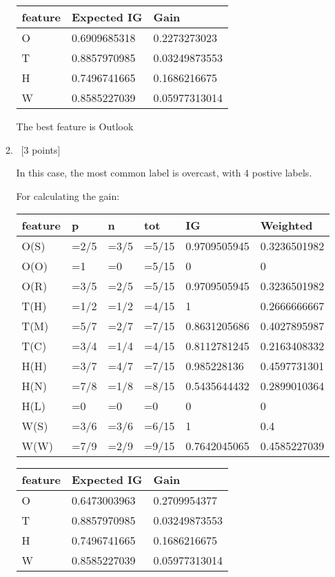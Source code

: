 \documentclass[12pt, fullpage,letterpaper]{article}
\begin{document}
\begin{enumerate}
\begin{enumerate}
	\begin{tabular}{|l|l|l|}
		\hline
		feature & Expected IG  & Gain          \\ \hline
		O       & 0.6909685318 & 0.2273273023  \\ \hline
		T       & 0.8857970985 & 0.03249873553 \\ \hline
		H       & 0.7496741665 & 0.1686216675  \\ \hline
		W       & 0.8585227039 & 0.05977313014 \\ \hline
		\end{tabular}

	The best feature is Outlook

\item~[3 points] 

In this case, the most common label is overcast, with 4 postive labels. 

For calculating the gain:

\begin{tabular}{|l|l|l|l|l|l|}
	\hline
	feature & p    & n    & tot   & IG           & Weighted     \\ \hline
	O(S)    & =2/5 & =3/5 & =5/15 & 0.9709505945 & 0.3236501982 \\ \hline
	O(O)    & =1   & =0   & =5/15 & 0            & 0            \\ \hline
	O(R)    & =3/5 & =2/5 & =5/15 & 0.9709505945 & 0.3236501982 \\ \hline
	T(H)    & =1/2 & =1/2 & =4/15 & 1            & 0.2666666667 \\ \hline
	T(M)    & =5/7 & =2/7 & =7/15 & 0.8631205686 & 0.4027895987 \\ \hline
	T(C)    & =3/4 & =1/4 & =4/15 & 0.8112781245 & 0.2163408332 \\ \hline
	H(H)    & =3/7 & =4/7 & =7/15 & 0.985228136  & 0.4597731301 \\ \hline
	H(N)    & =7/8 & =1/8 & =8/15 & 0.5435644432 & 0.2899010364 \\ \hline
	H(L)    & =0   & =0   & =0    & 0            & 0            \\ \hline
	W(S)    & =3/6 & =3/6 & =6/15 & 1            & 0.4          \\ \hline
	W(W)    & =7/9 & =2/9 & =9/15 & 0.7642045065 & 0.4585227039 \\ \hline
	\end{tabular}

	\begin{tabular}{|l|l|l|}
		\hline
		feature & Expected IG  & Gain          \\ \hline
		O       & 0.6473003963 & 0.2709954377  \\ \hline
		T       & 0.8857970985 & 0.03249873553 \\ \hline
		H       & 0.7496741665 & 0.1686216675  \\ \hline
		W       & 0.8585227039 & 0.05977313014 \\ \hline
		\end{tabular}


\end{enumerate}
\end{enumerate}
\end{document}
